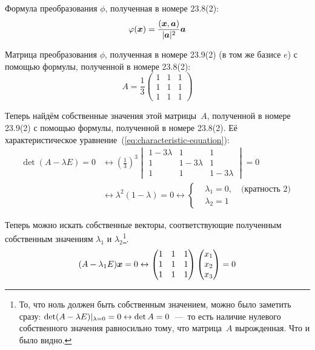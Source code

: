 \documentclass[a4paper,12pt]{article}
\begin{document}
  \begin{solution}
    Формула преобразования $\phi$, полученная в номере 23.8(2):
    \[
      \varphi(\boldsymbol x) = \frac{(\boldsymbol x, \boldsymbol a)}{|\boldsymbol a|^2} \boldsymbol a
    \]
    
    Матрица преобразования $\phi$, полученная в номере 23.9(2) (в том же базисе $e$) с помощью формулы, полученной в номере 23.8(2):
    \[
      A = \frac{1}{3} \begin{pmatrix}
        1 & 1 & 1\\
        1 & 1 & 1\\
        1 & 1 & 1
      \end{pmatrix}
    \]
    
    Теперь найдём собственные значения этой матрицы~$A$, полученной в номере 23.9(2) с помощью формулы, полученной в номере 23.8(2).
    Её характеристическое уравнение~(\ref{eq:characteristic-equation}):
    \begin{equation}
    \begin{split}
      \det(A - \lambda E) = 0
      &\leftrightarrow \left(\frac{1}{3}\right)^3 \begin{vmatrix}
        1 - 3\lambda & 1 & 1\\
        1 & 1 - 3\lambda & 1\\
        1 & 1 & 1 - 3\lambda
      \end{vmatrix} = 0\\
      &\leftrightarrow \lambda^2 (1 - \lambda) = 0
      \leftrightarrow \left\{
        \begin{aligned}
          &\lambda_1 = 0,\quad \mbox{(кратность $2$)}\\
          &\lambda_2 = 1
        \end{aligned}
      \right.
    \end{split}
    \end{equation}
    
    Теперь можно искать собственные векторы, соответствующие полученным собственным значениям $\lambda_1$ и $\lambda_2$\footnote{То, что ноль должен быть собственным значением, можно было заметить сразу: $\det (A \hm- \lambda E)|_{\lambda = 0} \hm= 0 \hm\leftrightarrow \det A = 0$~---~то есть наличие нулевого собственного значения равносильно тому, что матрица~$A$ вырожденная. Что и было видно.}.
    \[
      (A - \lambda_1 E) \boldsymbol x = 0
      \leftrightarrow \begin{pmatrix}
        1 & 1 & 1\\
        1 & 1 & 1\\
        1 & 1 & 1
      \end{pmatrix} \begin{pmatrix}
        x_1 \\ x_2 \\ x_3
      \end{pmatrix} = 0
    \]
    

\end{solution}
\end{document}
